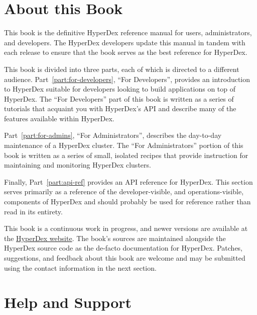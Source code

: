 \section{About this Book}
\label{sec:introduction:about}

This book is the definitive HyperDex reference manual for users, administrators,
and developers.  The HyperDex developers update this manual in tandem with each
release to ensure that the book serves as the best reference for HyperDex.

This book is divided into three parts, each of which is directed to a different
audience.  Part~\ref{part:for-developers}, ``For Developers'', provides an
introduction to HyperDex suitable for developers looking to build applications
on top of HyperDex.  The ``For Developers'' part of this book is written as a
series of tutorials that acquaint you with HyperDex's API and describe many of
the features available within HyperDex.

Part~\ref{part:for-admins}, ``For Administrators'', describes the day-to-day
maintenance of a HyperDex cluster.  The ``For Administrators'' portion of this
book is written as a series of small, isolated recipes that provide instruction
for maintaining and monitoring HyperDex clusters.


Finally, Part~\ref{part:api-ref} provides an API reference for HyperDex.  This
section serves primarily as a reference of the developer-visible, and
operations-visible, components of HyperDex and should probably be used for
reference rather than read in its entirety.

This book is a continuous work in progress, and newer versions are available at
the \href{http://hyperdex.org/}{HyperDex website}.  The book's sources are
maintained alongside the HyperDex source code as the de-facto documentation for
HyperDex.  Patches, suggestions, and feedback about this book are welcome and
may be submitted using the contact information in the next section.

\section{Help and Support}
\label{sec:introduction:support}

